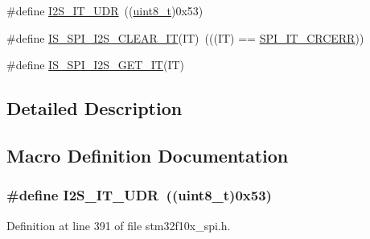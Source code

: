 \begin{DoxyCompactItemize}
\item 
\#define \hyperlink{group___s_p_i___i2_s__interrupts__definition_ga54aba7dc06f97fb4839de5f42bd5a47d}{I2\+S\+\_\+\+I\+T\+\_\+\+U\+DR}~((\hyperlink{_p_e___types_8h_aba7bc1797add20fe3efdf37ced1182c5}{uint8\+\_\+t})0x53)
\item 
\#define \hyperlink{group___s_p_i___i2_s__interrupts__definition_gabeb917a0a708af0439f753a5f4af4c5e}{I\+S\+\_\+\+S\+P\+I\+\_\+\+I2\+S\+\_\+\+C\+L\+E\+A\+R\+\_\+\+IT}(IT)~(((IT) == \hyperlink{openmotestm_2library_2inc_2stm32f10x__spi_8h_a9aa97a5ce8d3500dc14ca4e30eada199}{S\+P\+I\+\_\+\+I\+T\+\_\+\+C\+R\+C\+E\+RR}))
\item 
\#define \hyperlink{group___s_p_i___i2_s__interrupts__definition_gacb2949c066a74f1c4ef8c6a0d4e14a0c}{I\+S\+\_\+\+S\+P\+I\+\_\+\+I2\+S\+\_\+\+G\+E\+T\+\_\+\+IT}(IT)
\end{DoxyCompactItemize}


\subsection{Detailed Description}


\subsection{Macro Definition Documentation}
\subsubsection[{\texorpdfstring{I2\+S\+\_\+\+I\+T\+\_\+\+U\+DR}{I2S_IT_UDR}}]{\setlength{\rightskip}{0pt plus 5cm}\#define I2\+S\+\_\+\+I\+T\+\_\+\+U\+DR~(({\bf uint8\+\_\+t})0x53)}\hypertarget{group___s_p_i___i2_s__interrupts__definition_ga54aba7dc06f97fb4839de5f42bd5a47d}{}\label{group___s_p_i___i2_s__interrupts__definition_ga54aba7dc06f97fb4839de5f42bd5a47d}


Definition at line 391 of file stm32f10x\+\_\+spi.\+h.

